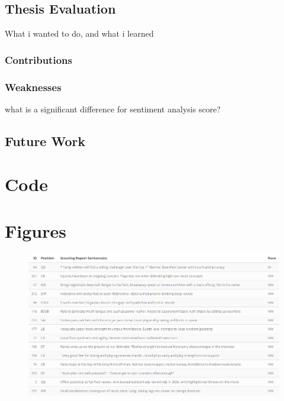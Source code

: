 \documentclass[oneside,12pt]{Classes/RoboticsLaTeX}
\begin{document}
\section{Thesis Evaluation}
What i wanted to do, and what i learned
\subsection{Contributions}
\subsection{Weaknesses}
what is a significant difference for sentiment analysis score?
\section{Future Work}

\renewcommand{\bibname}{References}           %


\appendix
\chapter{Code} 
\label{chap:Code}

\chapter{Figures} 
\label{chap:Figures}

\begin{figure}[htb]
  \centering
  \begin{minipage}{1\textwidth}
    \centering
    \includegraphics[width=1\linewidth]{Figures/2_sentence.png}
    \label{fig:2-sentence_dataset_sample}
  \end{minipage}%
\end{figure}
\end{document}
